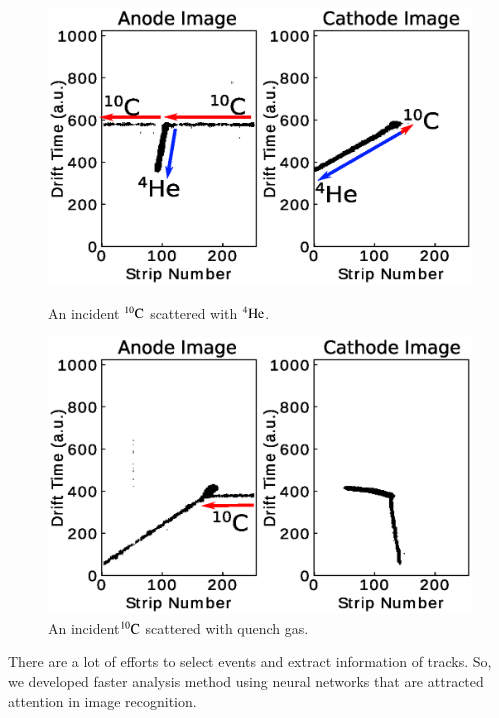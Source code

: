 \documentclass{jps-cp}
\begin{document}
\begin{figure}
  \centering
  \begin{minipage}{0.45\columnwidth}
    \centering
    \includegraphics[clip, width=0.9\columnwidth]{eps/true.eps}
    \caption{An incident ${}^{10}\rm{C}$ scattered with ${}^{4}\rm{He}$.}
    \label{fig:true}
  \end{minipage}
  \hfill
  \begin{minipage}{0.45\columnwidth}
    \centering
    \includegraphics[clip, width=0.9\columnwidth]{eps/false.eps}
    \caption{An incident${}^{10}\rm{C}$ scattered with quench gas.}
    \label{fig:false}
  \end{minipage}
\end{figure}

There are a lot of efforts to select events and extract information of tracks.
So, we developed faster analysis method using neural networks that are attracted attention in image recognition.
\end{document}
